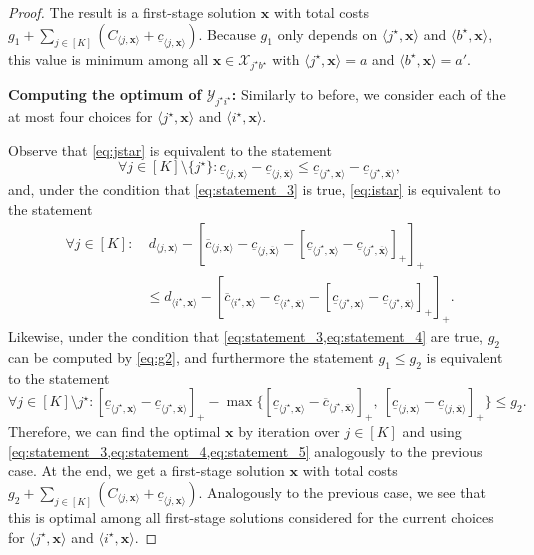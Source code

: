 \documentclass[a4paper,11pt,abstracton]{scrartcl}
\theoremstyle{definition}
\theoremstyle{remark}
\newcommand{\X}{\mathcal{X}}
\begin{document}
\begin{proof}
The result is a first-stage solution $\pmb{x}$ 
with total costs $g_1 + \sum_{j \in [K]} (C_{\langle j,\pmb{x}\rangle} + \underline{c}_{\langle j,\pmb{x}\rangle})$. 
Because $g_1$ only depends on $\langle j^\star,\pmb{x}\rangle$ and $\langle b^\star,\pmb{x}\rangle$, this value is minimum among all $\pmb x \in \X_{j^\star b^\star}$ with 
$\langle j^\star,\pmb{x}\rangle = a$ and $\langle b^\star,\pmb{x}\rangle = a'$.

\textbf{Computing the optimum of $\mathcal{Y}_{j^\star i^\star}$:} 
Similarly to before, we consider each of the at most four choices for 
$\langle j^\star,\pmb{x}\rangle$ and $\langle i^\star,\pmb{x}\rangle$.

Observe that \cref{eq:jstar} is equivalent to the statement
\begin{equation}
\forall j \in [K] \setminus \{ j^\star \} :  \underline{c}_{\langle j,\pmb{x}\rangle} - \underline{c}_{\langle j, \overline{\pmb{x}} \rangle} \leq \underline{c}_{\langle j^\star, \pmb{x}\rangle} - \underline{c}_{\langle j^\star,\overline{\pmb{x}}\rangle},
\label{eq:statement_3}
\end{equation}
and, under the condition that \cref{eq:statement_3} is true, \cref{eq:istar} is equivalent to the statement
\begin{align}
\forall j \in [K] \colon & \ d_{\langle j,\pmb{x}\rangle} - [\overline{c}_{\langle j,\pmb{x}\rangle}-\underline{c}_{\langle j, \overline{\pmb{x}}\rangle} - [\underline{c}_{\langle j^\star, \pmb{x}\rangle} - \underline{c}_{\langle j^\star, \overline{\pmb{x}}\rangle}]_+]_+ \nonumber \\ 
 & \leq d_{\langle i^\star,\pmb{x}\rangle} - [\overline{c}_{\langle i^\star,\pmb{x}\rangle}-\underline{c}_{\langle i^\star,\overline{\pmb{x}}\rangle} - [\underline{c}_{\langle j^\star,\pmb{x}\rangle} - \underline{c}_{\langle j^\star,\overline{\pmb{x}}\rangle}]_+]_+.
\label{eq:statement_4}
\end{align}
Likewise, under the condition that \cref{eq:statement_3,eq:statement_4} are true, $g_2$ can be computed by \cref{eq:g2}, and furthermore the statement $g_1 \leq g_2$ is equivalent to the statement
\begin{equation}
\forall j \in [K] \setminus{j^\star}: [\underline{c}_{\langle j^\star,\pmb{x}\rangle} - \underline{c}_{\langle j^\star,\overline{\pmb{x}}\rangle}]_+ - \max\{[\underline{c}_{\langle j^\star,\pmb{x}\rangle} - \overline{c}_{\langle j^\star,\overline{\pmb{x}}\rangle}]_+,\ [\underline{c}_{\langle j,\pmb{x}\rangle} - \underline{c}_{\langle j,\overline{\pmb{x}}\rangle}]_+ \} \leq g_2.
\label{eq:statement_5}
\end{equation}
Therefore, we can find the optimal $\pmb x$ by iteration over $j \in [K]$ and using \cref{eq:statement_3,eq:statement_4,eq:statement_5} analogously to the previous case.
At the end, we get a first-stage solution $\pmb{x}$ with total costs $g_2 + \sum_{j \in [K]} (C_{\langle j,\pmb{x}\rangle} + \underline{c}_{\langle j, \pmb{x}\rangle})$. 
Analogously to the previous case, we see that this is optimal among all first-stage solutions considered 
for the current choices for $\langle j^\star,\pmb{x}\rangle$ and $\langle i^\star,\pmb{x}\rangle$.
\end{proof}
\end{document}
